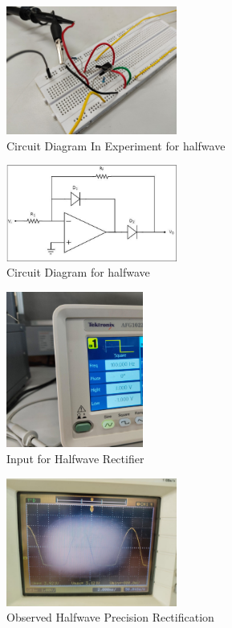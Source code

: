 \documentclass[a4paper,12pt]{article}
\begin{document}
\begin{figure}[H]
    \centering
    \includegraphics[width=0.5\textwidth]{figs/halfwavecircuit.png}
    \caption{Circuit Diagram In Experiment for halfwave}
\end{figure}
\begin{figure}[H]
    \centering
    \includegraphics[width=0.5\textwidth]{figs/halfwave_ideal.png}
    \caption{Circuit Diagram for halfwave}
\end{figure}
\begin{figure}[H]
    \centering
    \includegraphics[width=0.4\textwidth]{figs/integrator2.png}
    \caption{Input for Halfwave Rectifier}
\end{figure}
\begin{figure}[H]
    \centering
    \includegraphics[width=0.5\textwidth]{figs/halfwavevalue.png}
    \caption{Observed Halfwave Precision Rectification}
\end{figure}
\end{document}
